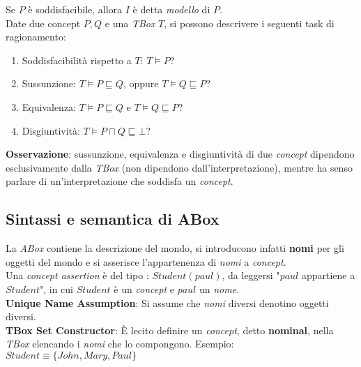 Se $P$ è soddisfacibile, allora $I$ è detta \textit{modello} di $P$.
\\

Date due concept $P, Q$ e una \textit{TBox} $T$, si possono descrivere i seguenti task di ragionamento:
\begin{enumerate}
\item Soddisfacibilità rispetto a $T$: $T \models P$?
\item Sussunzione: $T \models P \sqsubseteq Q$, oppure $T \models Q \sqsubseteq P$?
\item Equivalenza: $T \models P \sqsubseteq Q$ e $T \models Q \sqsubseteq P$?
\item Disgiuntività: $T \models P \sqcap Q \sqsubseteq \bot$?
\end{enumerate}

\textbf{Osservazione}: sussunzione, equivalenza e disgiuntività di due \textit{concept} dipendono esclusivamente dalla \textit{TBox} (non dipendono dall'interpretazione), mentre ha senso parlare di un'interpretazione che soddisfa un \textit{concept}.

\subsection{Sintassi e semantica di ABox}
La \textit{ABox} contiene la descrizione del mondo, si introducono infatti \textbf{nomi} per gli oggetti del mondo e si asserisce l'appartenenza di \textit{nomi} a \textit{concept}.
\\

Una \textit{concept assertion} è del tipo : $Student(paul)$, da leggersi "$paul$ appartiene a $Student$", in cui $Student$ è un \textit{concept} e $paul$ un \textit{nome}.
\\

\textbf{Unique Name Assumption}: Si assume che \textit{nomi} diversi denotino oggetti diversi.
\\

\textbf{TBox Set Constructor}: È lecito definire un \textit{concept}, detto \textbf{nominal}, nella \textit{TBox} elencando i \textit{nomi} che lo compongono. Esempio: $Student \equiv \lbrace John, Mary, Paul \rbrace$

